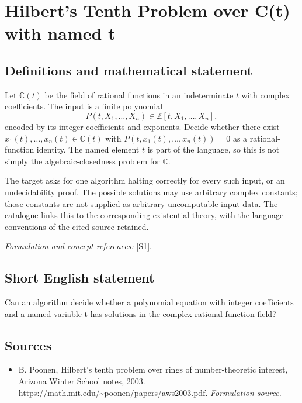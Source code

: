 \documentclass[11pt]{article}
\begin{document}
\section*{\texorpdfstring{Hilbert's Tenth Problem over C(t) with named t}{Hilbert's Tenth Problem over C(t) with named t}}\label{statement}
\subsection{Definitions and mathematical statement}
Let ${\mathbb{C}}(t)$ be the field of rational functions in an indeterminate $t$ with complex coefficients. The input is a finite polynomial
\[
 P(t,X_1,\ldots,X_n)\in{\mathbb{Z}}[t,X_1,\ldots,X_n],
\]
encoded by its integer coefficients and exponents. Decide whether there exist $x_1(t),\ldots,x_n(t)\in{\mathbb{C}}(t)$ with $P(t,x_1(t),\ldots,x_n(t))=0$ as a rational-function identity. The named element $t$ is part of the language, so this is not simply the algebraic-closedness problem for ${\mathbb{C}}$.

The target asks for one algorithm halting correctly for every such input, or an undecidability proof. The possible solutions may use arbitrary complex constants; those constants are not supplied as arbitrary uncomputable input data. The catalogue links this to the corresponding existential theory, with the language conventions of the cited source retained.
\par\smallskip\textit{Formulation and concept references:} \href{https://math.mit.edu/~poonen/papers/aws2003.pdf}{[S1]}.

\subsection{Short English statement}
Can an algorithm decide whether a polynomial equation with integer coefficients and a named variable t has solutions in the complex rational-function field?
\subsection{Sources}
\begin{itemize}
\item[S1]B. Poonen, Hilbert's tenth problem over rings of number-theoretic interest, Arizona Winter School notes, 2003.
\url{https://math.mit.edu/~poonen/papers/aws2003.pdf}.
\textit{Formulation source.}
\end{itemize}
\end{document}
